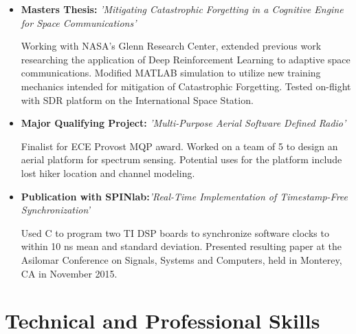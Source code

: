 \documentclass[11pt,a4paper,sans]{moderncv}        %
\begin{document}
\begin{itemize}[label={}]
\item{\textbf{Masters Thesis:} \textit{'Mitigating Catastrophic Forgetting in a Cognitive Engine for Space Communications'}


\small{Working with NASA's Glenn Research Center, extended previous work researching the application of Deep Reinforcement Learning to adaptive space communications. Modified MATLAB simulation to utilize new training mechanics intended for mitigation of Catastrophic Forgetting. Tested on-flight with SDR platform on the International Space Station.}}

\item{\textbf{Major Qualifying Project:} \textit{'Multi-Purpose Aerial Software Defined Radio'}


\small{Finalist for ECE Provost MQP award. Worked on a team of 5 to design an aerial platform for spectrum sensing. Potential uses for the platform include lost hiker location and channel modeling. }}

\iffalse %
\item{\textbf{Interactive Qualifying Project:} \textit{'Evaluating Smart City Development in Kowloon East'}


\small{Worked on a team of 4 to evaluate the modernization of a district of Hong Kong, focusing on ease of pedestrian travel within the region. Presented to the government office responsible for development.}}
\fi %

\item{\textbf{Publication with SPINlab:}\textit{'Real-Time Implementation of Timestamp-Free Synchronization'}


\small{Used C to program two TI DSP boards to synchronize software clocks to within 10 ns mean and standard deviation. Presented resulting paper at the Asilomar Conference on Signals, Systems and Computers, held in Monterey, CA in November 2015.}}

\end{itemize}

\section{Technical and Professional Skills}
\end{document}
